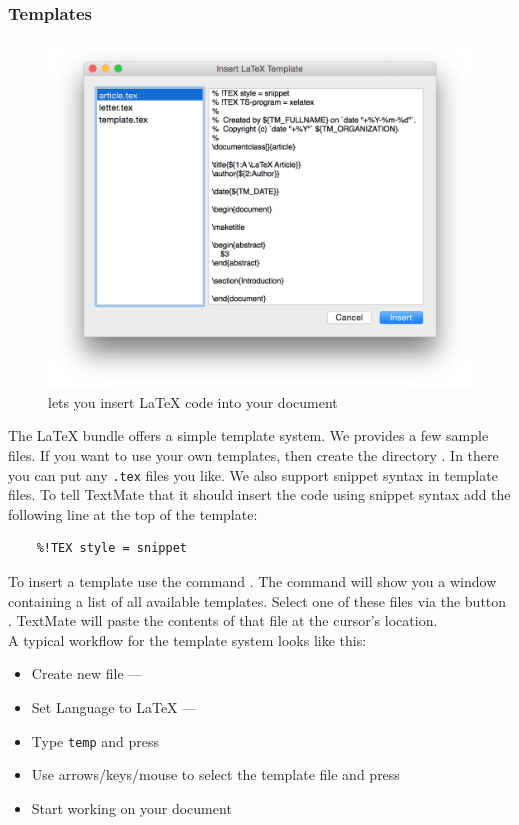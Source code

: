 \documentclass[11pt, x11names]{article}
\begin{document}
\subsubsection{Templates}

\begin{figure}[h]
  \centering
    \includegraphics[width=.8\textwidth]{Figures/Template Chooser.png}
  \caption{ lets you insert LaTeX code into your document}
  \label{fig:Figures_Template_Chooser}
\end{figure}

The LaTeX bundle offers a simple template system. We provides a few sample files. If you want to use your own templates, then create the directory . In there you can put any \texttt{.tex} files you like. We also support snippet syntax in template files. To tell TextMate that it should insert the code using snippet syntax add the following line at the top of the template:

\begin{verbatim}
    %!TEX style = snippet
\end{verbatim}

To insert a template use the command . The command will show you a window containing a list of all available templates. Select one of these files via the button . TextMate will paste the contents of that file at the cursor's location.\\

A typical workflow for the template system looks like this:

\begin{itemize}
  \item Create new file — 
  \item Set Language to LaTeX — 
  \item Type \texttt{temp} and press \keys{\tab}
  \item Use arrows/keys/mouse to select the template file and press \keys{\return}
  \item Start working on your document
\end{itemize}
\end{document}
